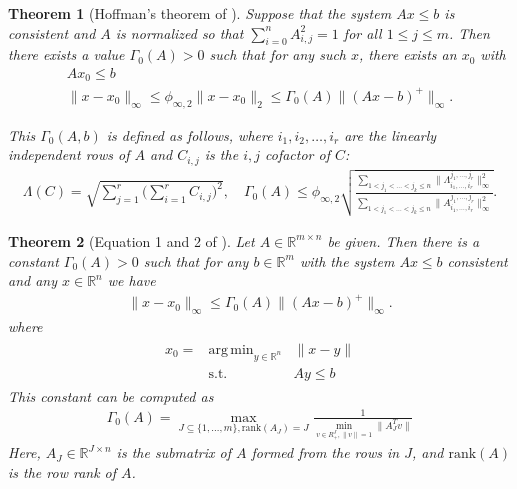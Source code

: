 \documentclass{article}
\newtheorem{theorem}{Theorem}[section]
\theoremstyle{case}
\numberwithin{theorem}{subsection}
\DeclareMathOperator*{\argmin}{arg\,min}
\newcommand{\huff}{{\Gamma_0}}
\newcommand{\Rm}{\mathbb R^m}
\newcommand{\Rn}{\mathbb R^n}
\begin{document}
\color{red}
\begin{theorem}[Hoffman's theorem of \cite{dummy:hoffman}]
\label{hoffman_old}
Suppose that the system $Ax \le b$ is consistent and $A$ is normalized so that $\sum_{i = 0}^n{A}_{i,j}^2 = 1$ for all $1 \le j \le m$.
Then there exists a value $\huff(A) > 0$ such that for any such $x$, there exists an $x_0$ with
\begin{align*}
Ax_0 \le b \\
\|x - x_0\|_{\infty} \le \phi_{\infty, 2}\|x - x_0\|_2 \le {\huff(A)} \|(Ax - b)^+\|_\infty.
\end{align*}

This $\huff(A,b)$ is defined as follows, where $i_1, i_2, \ldots, i_r$ are the linearly independent rows of $A$ and $C_{i,j}$ is the $i,j$ cofactor of $C$:
\begin{align*}
\Lambda(C) = \sqrt{\sum_{j=1}^r\bigg(\sum_{i=1}^r C_{i,j}\bigg)^2}, \quad
{\huff(A)} \le \phi_{\infty, 2}\sqrt{\frac{\sum_{1 < j_1 < \ldots < j_k \le n} \|\Lambda^{j_1,\ldots,j_r}_{i_1,\ldots, i_r}\|_{\infty}^2}{\sum_{1 < j_1 < \ldots < j_k \le n} \|A^{j_1,\ldots,j_r}_{i_1,\ldots, i_r}\|_{\infty}^2}}.
\end{align*}
\end{theorem}



\begin{theorem}[Equation 1 and 2 of \cite{pena2018algorithm}]
\label{hoffman}
Let $A \in \mathbb R^{m \times n}$ be given.
Then there is a constant $\huff(A) > 0$ such that for any $b \in \Rm$ with the system $Ax \le b$ consistent and any $x \in \Rn$ we have
\begin{align*}
\|x - x_0\|_{\infty} \le \huff(A) \|(Ax - b)^+\|_\infty.
\end{align*}
where
\begin{align*}
\begin{array}{ccc}
x_0 = & \argmin_{y \in \Rn} & \|x - y\| \\
      & \textrm{s.t.}    & Ay \le b
\end{array}
\end{align*}
This constant can be computed as
\begin{align*}
\huff(A) = \max_{J \subseteq \{1,\ldots,m\}, \textrm{rank}(A_J) = J} \frac 1 {\min_{v \in R^J_{+}, \|v\| = 1} \|A_J^Tv\|}
\end{align*}
Here, $A_J \in \mathbb R^{J \times n}$ is the submatrix of $A$ formed from the rows in $J$, and $\textrm{rank}(A)$ is the row rank of $A$.
\end{theorem}
\end{document}
